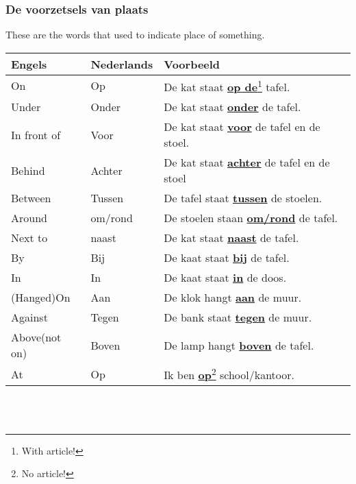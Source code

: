 \documentclass[a4paper,14pt]{extarticle}
\newcommand{\note}[2]{\underline{\textbf{#1}}\footnote{#2}}
\newcommand{\emp}[1]{\underline{\textbf{#1}}}
\begin{document}
\subsubsection{De voorzetsels van plaats}
These are the words that used to indicate place of something. \\
\begin{tabularx}{\textwidth}{ p{} p{} p{} }
 \hline
 Engels & Nederlands & Voorbeeld\\
 \hline
 On & Op & De kat staat \note{op de}{With article!} tafel. \\
 Under & Onder & De kat staat \emp{onder} de tafel.\\
 In front of & Voor & De kat staat \emp{voor} de tafel en de stoel.\\
 Behind & Achter & De kat staat \emp{achter} de tafel en de stoel\\
 Between & Tussen & De tafel staat \emp{tussen} de stoelen.\\
 Around & om/rond & De stoelen staan \emp{om/rond} de tafel.\\
 Next to & naast & De kat staat \emp{naast} de tafel.\\
 By & Bij & De kaat staat \emp{bij} de tafel.\\
 In & In & De kaat staat \emp{in} de doos.\\
 (Hanged)On & Aan & De klok hangt \emp{aan} de muur.\\
 Against & Tegen & De bank staat \emp{tegen} de muur.\\
 Above(not on) & Boven & De lamp hangt \emp{boven} de tafel.\\
 At & Op & Ik ben \note{op}{No article!} school/kantoor.
\end{tabularx} \\ 
\hfill \\
\end{document}
